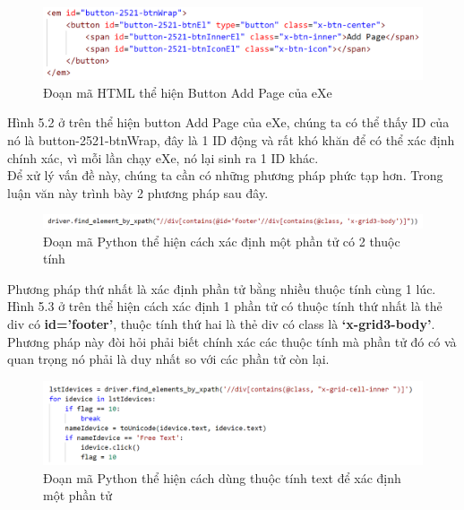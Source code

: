 \begin{center}
	\begin{figure}[htp]
		\begin{center}
			\includegraphics[width=15cm]{Chapter5/Pictures/picture52.png}
		\end{center}
		\caption{Đoạn mã HTML thể hiện Button Add Page của eXe}
		\label{refhinhchuong711}
	\end{figure}
\end{center}

Hình 5.2 ở trên thể hiện button Add Page của eXe, chúng ta có thể thấy ID của nó là button-2521-btnWrap, đây là 1 ID động và rất khó khăn để có thể xác định chính xác, vì mỗi lần chạy eXe, nó lại sinh ra 1 ID khác.\\

Để xử lý vấn đề này, chúng ta cần có những phương pháp phức tạp hơn. Trong luận văn này trình bày 2 phương pháp sau đây.

\begin{center}
	\begin{figure}[htp]
		\begin{center}
			\includegraphics[width=15cm]{Chapter5/Pictures/picture53.png}
		\end{center}
		\caption{Đoạn mã Python thể hiện cách xác định một phần tử có 2 thuộc tính}
		\label{refhinhchuong65}
	\end{figure}
\end{center}

Phương pháp thứ nhất là xác định phần tử bằng nhiều thuộc tính cùng 1 lúc. Hình 5.3 ở trên thể hiện cách xác định 1 phần tử có thuộc tính thứ nhất là thẻ div có \textbf{id=’footer’}, thuộc tính thứ hai là thẻ div có class là \textbf{‘x-grid3-body’}. Phương pháp này đòi hỏi phải biết chính xác các thuộc tính mà phần tử đó có và quan trọng nó phải là duy nhất so với các phần tử còn lại.\\

\begin{center}
	\begin{figure}[htp]
		\begin{center}
			\includegraphics[width=15cm]{Chapter5/Pictures/picture54.png}
		\end{center}
		\caption{Đoạn mã Python thể hiện cách dùng thuộc tính text để xác định một phần tử}
		\label{refhinhchuong66}
	\end{figure}
\end{center}

